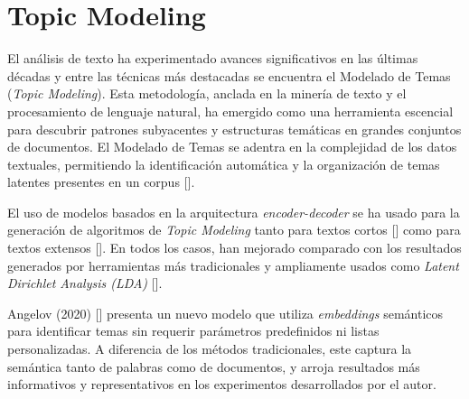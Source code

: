 \section{Topic Modeling}

    El análisis de texto ha experimentado avances significativos en las últimas décadas y entre las técnicas más destacadas se encuentra el Modelado de Temas (\emph{Topic Modeling}). Esta metodología, anclada en la minería de texto y el procesamiento de lenguaje natural, ha emergido como una herramienta escencial para descubrir patrones subyacentes y estructuras temáticas en grandes conjuntos de documentos. El Modelado de Temas se adentra en la complejidad de los datos textuales, permitiendo la identificación automática y la organización de temas latentes presentes en un corpus [\cite{lda2003}].

    El uso de modelos basados en la arquitectura \emph{encoder-decoder} se ha usado para la generación de algoritmos de \emph{Topic Modeling }tanto para textos cortos [\cite{neuraltm}] como para textos extensos [\cite{tminemb}]. En todos los casos, han mejorado comparado con los resultados generados por herramientas más tradicionales y ampliamente usados como \emph{Latent Dirichlet Analysis (LDA)} [\cite{lda2003}].  

    Angelov (2020) [\cite{angelov2020top2vec}] presenta un nuevo modelo que utiliza \emph{embeddings} semánticos para identificar temas sin requerir parámetros predefinidos ni listas personalizadas. A diferencia de los métodos tradicionales, este captura la semántica tanto de palabras como de documentos, y arroja resultados más informativos y representativos en los experimentos desarrollados por el autor.

